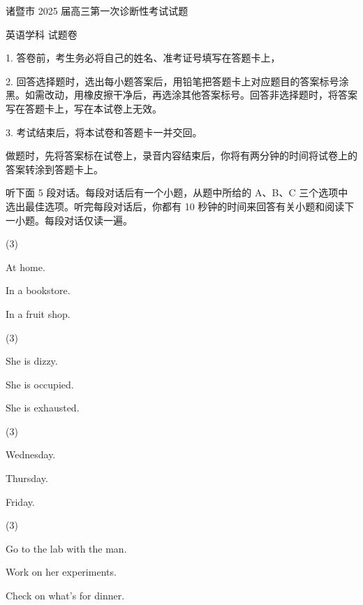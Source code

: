 \documentclass{英语试卷}
\begin{document}
\par 诸暨市 2025 届高三第一次诊断性考试试题\par
\par 英语学科 试题卷\par
\begin{notice}
\par 1. 答卷前，考生务必将自己的姓名、准考证号填写在答题卡上，\par
\par 2. 回答选择题时，选出每小题答案后，用铅笔把答题卡上对应题目的答案标号涂黑。如需改动，用橡皮擦干净后，再选涂其他答案标号。回答非选择题时，将答案写在答题卡上，写在本试卷上无效。\par
\par 3. 考试结束后，将本试卷和答题卡一并交回。\par
\end{notice}
\par 做题时，先将答案标在试卷上，录音内容结束后，你将有两分钟的时间将试卷上的答案转涂到答题卡上。\par
{}
\par 听下面 5 段对话。每段对话后有一个小题，从题中所给的 A、B、C 三个选项中选出最佳选项。听完每段对话后，你都有 10 秒钟的时间来回答有关小题和阅读下一小题。每段对话仅读一遍。\par
{}
\begin{choices}(3)
  \item At home.
  \item In a bookstore.
  \item In a fruit shop.
\end{choices}
\begin{choices}(3)
  \item She is dizzy.
  \item She is occupied.
  \item She is exhausted.
\end{choices}
\begin{choices}(3)
  \item Wednesday.
  \item Thursday.
  \item Friday.
\end{choices}
\begin{choices}(3)
  \item Go to the lab with the man.
  \item Work on her experiments.
  \item Check on what's for dinner.
\end{choices}
\end{document}
